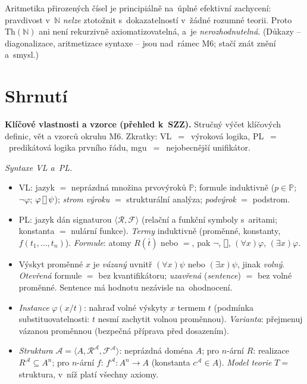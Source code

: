 \documentclass[11pt,a4paper]{article}
\newcommand{\conn}{\mathbin{\vcenter{\hbox{\framebox[1.05ex][c]{\rule{0pt}{0.72ex}}}}}}
\begin{document}
\begin{intuice}
Aritmetika přirozených čísel je principiálně  na~úplné efektivní zachycení: pravdivost v~$\mathbb{N}$ \emph{nelze} ztotožnit s~dokazatelností v~žádné rozumné teorii. Proto $\mathrm{Th}(\mathbb{N})$ ani není rekurzivně axiomatizovatelná, a~je \emph{nerozhodnutelná}. (Důkazy -- diagonalizace, aritmetizace syntaxe -- jsou nad~rámec M6; stačí znát znění a~smysl.)
\end{intuice}

\section*{Shrnutí}

\begin{poznamka}
\textbf{Klíčové vlastnosti a vzorce (přehled k~SZZ).} Stručný výčet klíčových definic, vět a vzorců okruhu M6. Zkratky: VL~$=$~výroková logika, PL~$=$~predikátová logika prvního řádu, mgu~$=$~nejobecnější unifikátor.

\smallskip
\emph{Syntaxe VL a~PL.}
\begin{itemize}
  \item VL: jazyk $=$ neprázdná množina prvovýroků $\mathbb{P}$; formule induktivně ($p\in\mathbb{P}$; $\neg\varphi$; $\varphi\conn\psi$); \emph{strom výroku} $=$ strukturální analýza; \emph{podvýrok} $=$ podstrom.
  \item PL: jazyk dán signaturou $\langle\mathcal R,\mathcal F\rangle$ (relační a funkční symboly s~aritami; konstanta $=$ nulární funkce). \emph{Termy} induktivně (proměnné, konstanty, $f(t_1,\dots,t_n)$). \emph{Formule}: atomy $R(\bar t)$ nebo $=$, pak $\neg$, $\conn$, $(\forall x)\varphi$, $(\exists x)\varphi$.
  \item Výskyt proměnné $x$ je \emph{vázaný} uvnitř $(\forall x)\psi$ nebo $(\exists x)\psi$, jinak \emph{volný}. \emph{Otevřená} formule $=$ bez kvantifikátoru; \emph{uzavřená} (\emph{sentence}) $=$ bez volné proměnné. Sentence má hodnotu nezávisle na~ohodnocení.
  \item \emph{Instance} $\varphi(x/t)$: nahraď volné výskyty $x$ termem $t$ (podmínka substituovatelnosti: $t$ nesmí zachytit volnou proměnnou). \emph{Varianta}: přejmenuj vázanou proměnnou (bezpečná příprava před dosazením).
  \item \emph{Struktura} $\mathcal A=\langle A,\mathcal R^{\mathcal A},\mathcal F^{\mathcal A}\rangle$: neprázdná doména $A$; pro $n$-ární $R$: realizace $R^{\mathcal A}\subseteq A^n$; pro $n$-ární $f$: $f^{\mathcal A}\colon A^n\to A$ (konstanta $c^{\mathcal A}\in A$). \emph{Model teorie} $T=$ struktura, v~níž platí všechny axiomy.
\end{itemize}


\end{poznamka}
\end{document}
